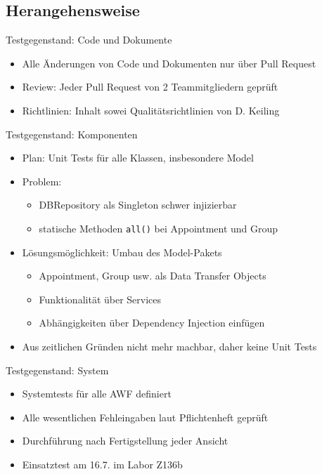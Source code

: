 \documentclass{beamer}
\begin{document}
  \subsection{Herangehensweise}
  \begin{frame}{\subsecname}
    \begin{block}{Testgegenstand: Code und Dokumente}
      \begin{itemize}
        \item Alle Änderungen von Code und Dokumenten nur über Pull Request
        \item Review: Jeder Pull Request von 2 Teammitgliedern geprüft
        \item Richtlinien: Inhalt sowei Qualitätsrichtlinien von D. Keiling
      \end{itemize}
    \end{block}
  \end{frame}

  \begin{frame}{\subsecname}
    \begin{block}{Testgegenstand: Komponenten}
      \begin{itemize}
        \item Plan: Unit Tests für alle Klassen, insbesondere Model
        \item Problem:
          \begin{itemize}
            \item DBRepository als Singleton schwer injizierbar
            \item statische Methoden \texttt{all()} bei Appointment und Group
          \end{itemize}
        \item Lösungsmöglichkeit: Umbau des Model-Pakets
          \begin{itemize}
            \item Appointment, Group usw. als Data Transfer Objects
            \item Funktionalität über Services
            \item Abhängigkeiten über Dependency Injection einfügen
          \end{itemize}
        \item Aus zeitlichen Gründen nicht mehr machbar, daher keine Unit Tests
      \end{itemize}
    \end{block}
  \end{frame}

  \begin{frame}{\subsecname}
    \begin{block}{Testgegenstand: System}
      \begin{itemize}
        \item Systemtests für alle AWF definiert
        \item Alle wesentlichen Fehleingaben laut Pflichtenheft geprüft
        \item Durchführung nach Fertigstellung jeder Ansicht
        \item Einsatztest am 16.7. im Labor Z136b
      \end{itemize}
    \end{block}
  \end{frame}
\end{document}
